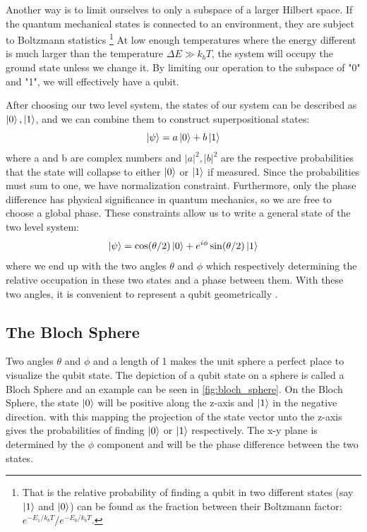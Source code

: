 Another way is to limit ourselves to only a subspace of a larger Hilbert space. If the quantum mechanical states is connected to an environment, they are subject to Boltzmann statistics \footnote{That is the relative probability of finding a qubit in two different states (say $\ket{1}$ and $\ket{0}$) can be found as the fraction between their Boltzmann factor: $e^{-E_1 / k_b  T} / e^{- E_0 / k_b  T}$.} At low enough temperatures where the energy different is much larger than the temperature $\Delta E \gg k_b T$, the system will occupy the ground state unless we change it. By limiting our operation to the subspace of "0" and "1", we will effectively have a qubit. 

After choosing our two level system, the states of our system can be described as $\ket{0}, \ket{1}$, and we can combine them to construct superpositional states:
\begin{equation}
    \ket{\psi} = a \ket{0} + b \ket{1}
\end{equation}
where a and b are complex numbers and $|a|^2, |b|^2$ are the respective probabilities that the state will collapse to either $\ket{0}$ or $\ket{1}$ if measured. Since the probabilities must sum to one, we have normalization constraint. Furthermore, only the phase difference has physical significance in quantum mechanics, so we are free to choose a global phase. These constraints allow us to write a general state of the two level system:
\begin{equation}\label{eq:general_2_state}
    \ket{\psi} = \cos (\theta / 2) \ket{0} + e^{i\phi}\sin(\theta / 2)\ket{1}
\end{equation}
where we end up with the two angles $\theta$ and $\phi$ which respectively determining the relative occupation in these two states and a phase between them. With these two angles, it is convenient to represent a qubit geometrically \cite{krantz_quantum_2019}.

\subsection{The Bloch Sphere}
Two angles $\theta$ and $\phi$ and a length of 1 makes the unit sphere a perfect place to visualize the qubit state. The depiction of a qubit state on a sphere is called a Bloch Sphere and an example can be seen in \ref{fig:bloch_sphere}. On the Bloch Sphere, the state $\ket{0}$ will be positive along the z-axis and $\ket{1}$ in the negative direction. with this mapping the projection of the state vector unto the z-axis gives the probabilities of finding $\ket{0}$ or $\ket{1}$ respectively. The x-y plane is determined by the $\phi$ component and will be the phase difference between the two states. \cite{krantz_week_2019}


